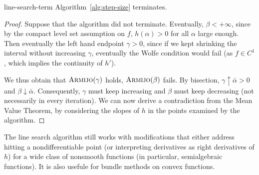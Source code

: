 \begin{ctheorem}{}{line-search-term}
	Algorithm~\ref{alg:step-size} terminates.
\end{ctheorem}
\begin{proof}
	Suppose that the algorithm did not terminate. Eventually, $\beta <
	+\infty$, since by the compact level set assumption on $f$, $h(\alpha) > 0$
	for all $\alpha$ large enough. Then eventually the left hand endpoint
	$\gamma > 0$, since if we kept shrinking the interval without increasing
	$\gamma$, eventually the Wolfe condition would fail (as $f \in C^1$, which
	implies the continuity of $h'$).

	We thus obtain that $\textsc{Armijo}(\gamma)$ holds,
	$\textsc{Armijo}(\beta)$ fails. By bisection, $\gamma \uparrow \bar{\alpha}
	> 0$ and $\beta \downarrow \bar{\alpha}$. Consequently, $\gamma$ must keep
	increasing and $\beta$ must keep decreasing (not necessarily in every
	iteration). We can now derive a contradiction from the Mean Value Theorem,
	by considering the slopes of $h$ in the points examined by the algorithm.
\end{proof}

\begin{remark}
	The line search algorithm still works with modifications that either
	address hitting a nondifferentiable point (or interpreting derivatives as
	right derivatives of $h$) for a wide class of nonsmooth functions (in
	particular, semialgebraic functions). It is also usefule for bundle methods
	on convex functions.
\end{remark}

